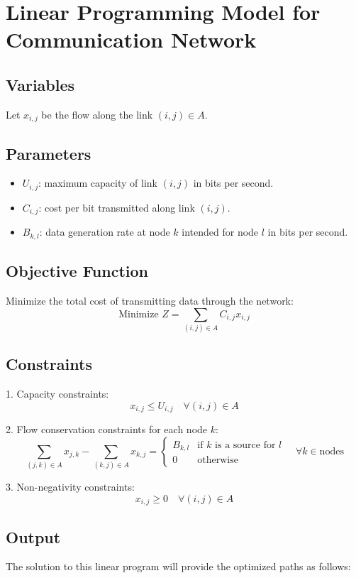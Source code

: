 \documentclass{article}
\begin{document}
\section*{Linear Programming Model for Communication Network}

\subsection*{Variables}
Let \( x_{i,j} \) be the flow along the link \( (i,j) \in A \).

\subsection*{Parameters}
\begin{itemize}
    \item \( U_{i,j} \): maximum capacity of link \( (i,j) \) in bits per second.
    \item \( C_{i,j} \): cost per bit transmitted along link \( (i,j) \).
    \item \( B_{k,l} \): data generation rate at node \( k \) intended for node \( l \) in bits per second.
\end{itemize}

\subsection*{Objective Function}
Minimize the total cost of transmitting data through the network:
\[
\text{Minimize } Z = \sum_{(i,j) \in A} C_{i,j} x_{i,j}
\]

\subsection*{Constraints}
1. Capacity constraints:
\[
x_{i,j} \leq U_{i,j} \quad \forall (i,j) \in A
\]

2. Flow conservation constraints for each node \( k \):
\[
\sum_{(j,k) \in A} x_{j,k} - \sum_{(k,j) \in A} x_{k,j} = 
\begin{cases} 
B_{k,l} & \text{if } k \text{ is a source for } l \\
0 & \text{otherwise}
\end{cases}
\quad \forall k \in \text{nodes}
\]

3. Non-negativity constraints:
\[
x_{i,j} \geq 0 \quad \forall (i,j) \in A
\]

\subsection*{Output}
The solution to this linear program will provide the optimized paths as follows:
\end{document}
